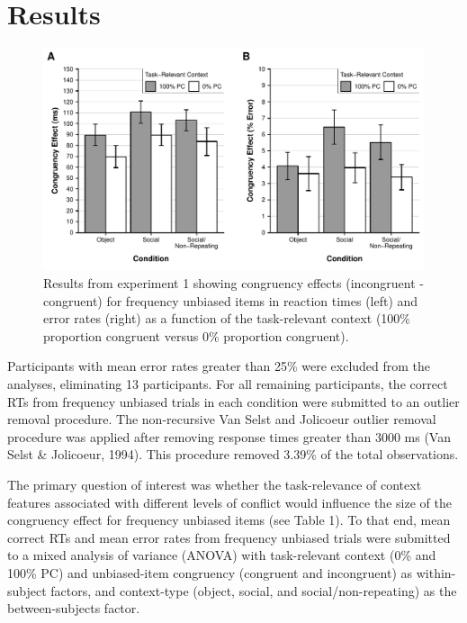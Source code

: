 \documentclass[english,,man,floatsintext]{apa6}
\begin{document}
\section{Results}\label{results}






\begin{figure}
\centering
\includegraphics{v1-task-relevance-cspc_files/figure-latex/figure2-1.pdf}
\caption{\label{fig:figure2}Results from experiment 1 showing congruency effects
(incongruent - congruent) for frequency unbiased items in reaction times
(left) and error rates (right) as a function of the task-relevant
context (100\% proportion congruent versus 0\% proportion congruent).}
\end{figure}

Participants with mean error rates greater than 25\% were excluded from
the analyses, eliminating 13 participants. For all remaining
participants, the correct RTs from frequency unbiased trials in each
condition were submitted to an outlier removal procedure. The
non-recursive Van Selst and Jolicoeur outlier removal procedure was
applied after removing response times greater than 3000 ms (Van Selst \&
Jolicoeur, 1994). This procedure removed 3.39\% of the total
observations.

The primary question of interest was whether the task-relevance of
context features associated with different levels of conflict would
influence the size of the congruency effect for frequency unbiased items
(see Table 1). To that end, mean correct RTs and mean error rates from
frequency unbiased trials were submitted to a mixed analysis of variance
(ANOVA) with task-relevant context (0\% and 100\% PC) and unbiased-item
congruency (congruent and incongruent) as within-subject factors, and
context-type (object, social, and social/non-repeating) as the
between-subjects factor.
\end{document}
